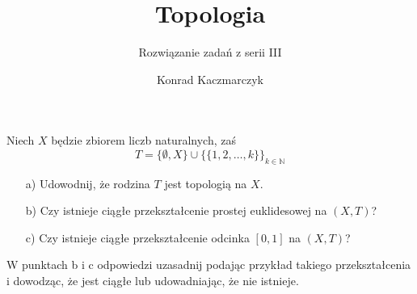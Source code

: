 \documentclass[11pt]{scrartcl}
\author{Konrad Kaczmarczyk}
\begin{document}
  \title{Topologia}
  \subtitle{Rozwiązanie zadań z serii III}
  \maketitle
    \begin{zadanie*}
        Niech $X$ będzie zbiorem liczb naturalnych, zaś
        \[
          T = \{\emptyset, X\} \cup \{\{1, 2, \dots, k\}\}_{k \in \mathbb{N}}
        \]

        \begin{itemize}
            \item[a)] Udowodnij, że rodzina $T$ jest topologią na $X$.
            \item[b)] Czy istnieje ciągłe przekształcenie prostej euklidesowej na $(X, T)$?
            \item[c)] Czy istnieje ciągłe przekształcenie odcinka $[0, 1]$ na $(X, T)$?
        \end{itemize}

        W punktach b i c odpowiedzi uzasadnij podając przykład takiego przekształcenia i dowodząc, że jest ciągłe lub udowadniając, że nie istnieje.
        \end{zadanie*}
\end{document}
